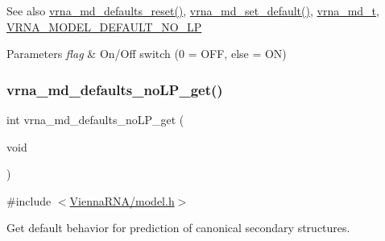 \begin{DoxySeeAlso}{See also}
\hyperlink{group__model__details_ga70834424cf804d149937de89f80ceb45}{vrna\+\_\+md\+\_\+defaults\+\_\+reset()}, \hyperlink{group__model__details_ga8ac6ff84936282436f822644bf841f66}{vrna\+\_\+md\+\_\+set\+\_\+default()}, \hyperlink{group__model__details_ga1f8a10e12a0a1915f2a4eff0b28ea17c}{vrna\+\_\+md\+\_\+t}, \hyperlink{group__model__details_gab72462726dd60ed0d43339bbf7ee08ad}{V\+R\+N\+A\+\_\+\+M\+O\+D\+E\+L\+\_\+\+D\+E\+F\+A\+U\+L\+T\+\_\+\+N\+O\+\_\+\+LP} 
\end{DoxySeeAlso}

\begin{DoxyParams}{Parameters}
{\em flag} & On/\+Off switch (0 = O\+FF, else = ON) \\
\hline
\end{DoxyParams}
\mbox{\label{group__model__details_ga934344888fbacaed538bbbfe910f2aa6}} 
\subsubsection{\texorpdfstring{vrna\+\_\+md\+\_\+defaults\+\_\+no\+L\+P\+\_\+get()}{vrna\_md\_defaults\_noLP\_get()}}
{\footnotesize\ttfamily int vrna\+\_\+md\+\_\+defaults\+\_\+no\+L\+P\+\_\+get (\begin{DoxyParamCaption}\item[{void}]{ }\end{DoxyParamCaption})}



{\ttfamily \#include $<$\hyperlink{model_8h}{Vienna\+R\+N\+A/model.\+h}$>$}



Get default behavior for prediction of canonical secondary structures. 

